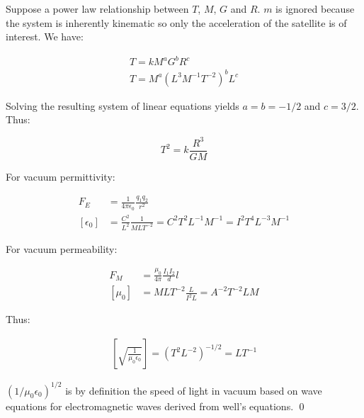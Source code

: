 \documentclass[12pt]{article}
\begin{document}
Suppose a power law relationship between $T$, $M$, $G$ and $R$. $m$ is ignored because the system is inherently kinematic so only the acceleration of the satellite is of interest. We have:

\begin{equation}
\begin{split}
    T = k M^{a} G^{b} R^{c} \\
    T = M^{a} (L^{3} M^{-1} T^{-2})^{b} L^{c}
\end{split}
\end{equation}

Solving the resulting system of linear equations yields $a = b = -1/2$ and $c = 3/2$. Thus:

\begin{equation}
    T^{2} = k \frac{R^{3}}{GM}
\end{equation}

For vacuum permittivity:

\begin{equation}
\begin{split}
    F_{E} &= \frac{1}{4\pi \epsilon_{0}} \frac{q_{1} q_{2}}{r^{2}} \\
    [\epsilon_{0}] &= \frac{C^{2}}{L^{2}} \frac{1}{M L T^{-2}} = C^{2} T^{2} L^{-1} M^{-1} = I^{2} T^{4} L^{-3} M^{-1}
\end{split}
\end{equation}

For vacuum permeability:

\begin{equation}
\begin{split}
    F_{M} &= \frac{\mu_{0}}{4\pi} \frac{I_{1} I_{2}}{d} l \\
    [\mu_{0}] &= M L T^{-2} \frac{L}{I^{2} L} = A^{-2} T^{-2} L M
\end{split}
\end{equation}

Thus:

\begin{equation}
\begin{split}
    \left[ \sqrt{\frac{1}{\mu_{0} \epsilon_{0}}} \right] = \left( T^{2} L^{-2}\right)^{-1/2} = L T^{-1}
\end{split}
\end{equation}

$(1/\mu_{0} \epsilon_{0})^{1/2}$ is by definition the speed of light in vacuum based on wave equations for electromagnetic waves derived from well's equations.
\qed
\end{document}
